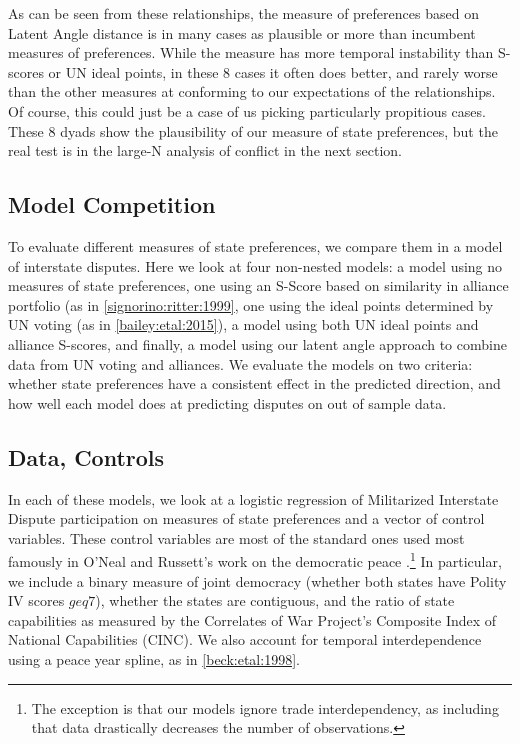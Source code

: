 As can be seen from these relationships, the measure of preferences based on Latent Angle distance is in many cases as plausible or more than incumbent measures of preferences. While the measure has more temporal instability than S-scores or UN ideal points, in these 8 cases it often does better, and rarely worse than the other measures at conforming to our expectations of the relationships. Of course, this could just be a case of us picking particularly propitious cases. These 8 dyads show the plausibility of our measure of state preferences, but the real test is in the large-N analysis of conflict in the next section.


\subsection*{Model Competition}

To evaluate different measures of state preferences, we compare them in a model of interstate disputes. Here we look at four non-nested models: a model using no measures of state preferences, one using an S-Score based on similarity in alliance portfolio (as in \ref{signorino:ritter:1999}, one using the ideal points determined by UN voting (as in \ref{bailey:etal:2015}), a model using both UN ideal points and alliance S-scores, and finally, a model using our latent angle approach to combine data from UN voting and alliances. We evaluate the models on two criteria: whether state preferences have a consistent effect in the predicted direction, and how well each model does at predicting disputes on out of sample data.

\subsection*{Data, Controls}

In each of these models, we look at a logistic regression of Militarized Interstate Dispute participation on measures of state preferences and a vector of control variables. These control variables are most of the standard ones used most famously in O'Neal and Russett's work on the democratic peace \citep{oneal:russett:1997}.\footnote{The exception is that our models ignore trade interdependency, as including that data drastically decreases the number of observations.} In particular, we include a binary measure of joint democracy (whether both states have Polity IV scores $geq 7$), whether the states are contiguous, and the ratio of state capabilities as measured by the Correlates of War Project's Composite Index of National Capabilities (CINC). We also account for temporal interdependence using a peace year spline, as in \ref{beck:etal:1998}. 

